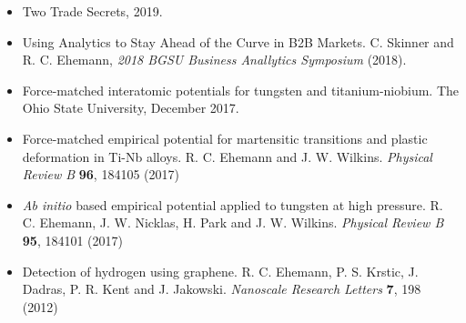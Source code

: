 \documentclass[9pt]{developercv} %
\begin{document}
\begin{entrylist}
	\entry
		{}
		{}
		{}
		{%
\vspace{-2\baselineskip}
\renewcommand{\labelitemi}{\textcolor{gray}{$\blacksquare$}}
\begin{itemize}
\setlength{\itemindent}{-1cm}
\item Two Trade Secrets, 2019.
\item Using Analytics to Stay Ahead of the Curve in B2B Markets. C. Skinner and R. C. Ehemann, \emph{2018 BGSU Business Anallytics Symposium} (2018).
\item Force-matched interatomic potentials for tungsten and titanium-niobium. The Ohio State University, December 2017.
\item Force-matched empirical potential for martensitic transitions and plastic deformation in Ti-Nb alloys. R. C. Ehemann and J. W. Wilkins. {\emph{Physical Review B}} {\bf{96}}, 184105 (2017)
\item {\emph{Ab initio}} based empirical potential applied to tungsten at high pressure. R. C. Ehemann, J. W. Nicklas, H. Park and J. W. Wilkins. {\emph{Physical Review B}} {\bf{95}}, 184101 (2017)
\item Detection of hydrogen using graphene. R. C. Ehemann, P. S. Krstic, J. Dadras, P. R. Kent and J. Jakowski. {\emph{Nanoscale Research Letters}} {\bf{7}}, 198 (2012)
\end{itemize}}
\end{entrylist}

\begin{entrylist}
\end{entrylist}
\end{document}
